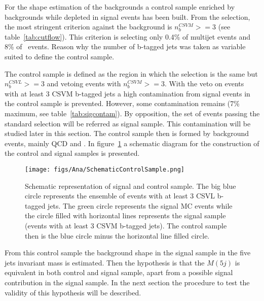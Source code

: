 For the shape estimation of the backgrounds a control sample enriched by backgrounds while depleted in signal events has been built. From the selection, the most stringent criterion against the background is $n_{b}^{CSVM}>=3$ (see table~\ref{tab:cutflow}). This criterion is selecting only 0.4\% of multijet events and 8\% of \ttbar~events. Reason  why the number of b-tagged jets was taken as variable suited to define the control sample. %

The control sample is defined as the region in which  the selection is the same but $n_{b}^{CSVL}>=3$ and vetoing events with $n_{b}^{CSVM}>=3$. With the veto on events with at least 3 CSVM b-tagged jets a high contamination from signal events in the control sample is prevented. However, some contamination remains (7\% maximum, see table~\ref{tab:sigcontam}). By opposition, the set of events passing the standard selection will be referred as signal sample.  This contamination will be studied later in this section. The control sample then is formed by background events, mainly QCD and \ttbar. In figure~\ref{fig:CSSSSche} a schematic diagram for the construction of the control and signal samples is presented.

\begin{figure}[!Hhtbp]
  \begin{center}
    \texttt{[image: figs/Ana/SchematicControlSample.png]}
    \caption{Schematic representation of signal and control sample. The big blue circle represents the ensemble of events with at least 3 CSVL b-tagged jets. The green circle represents the signal MC events while the circle filled with horizontal lines represents the signal sample (events with at least 3 CSVM b-tagged jets). The control sample then is the blue circle minus the horizontal line filled circle.}
    \label{fig:CSSSSche}
  \end{center}
\end{figure}

From this control sample the background shape in the signal sample in the five jets invariant mass is estimated. Then the hypothesis is that the $M(5j)$ is equivalent in both control and signal sample, apart from a possible signal contribution in the signal sample. In the next section the procedure to test the validity of this hypothesis will be described. 

